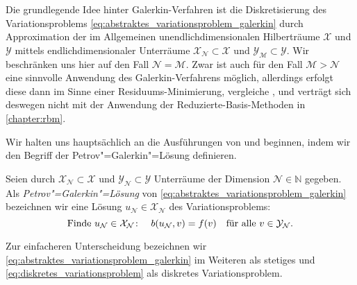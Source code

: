 \documentclass[../main.tex]{subfiles}
\begin{document}
Die grundlegende Idee hinter Galerkin-Verfahren ist die Diskretisierung des Variationsproblems \cref{eq:abstraktes_variationsproblem_galerkin} durch Approximation der im Allgemeinen unendlichdimensionalen Hilberträume $\mathcal X$ und $\mathcal Y$ mittels endlichdimensionaler Unterräume $\mathcal X_{\mathcal N} \subset \mathcal X$ und $\mathcal Y_{\mathcal M} \subset \mathcal Y$.
Wir beschränken uns hier auf den Fall $\mathcal N = \mathcal M$.
Zwar ist auch für den Fall $\mathcal M > \mathcal N$ eine sinnvolle Anwendung des Galerkin-Verfahrens möglich, allerdings erfolgt diese dann im Sinne einer Residuums-Minimierung, vergleiche \cite{Andreev:2012ep}, und verträgt sich deswegen nicht mit der Anwendung der Reduzierte-Basis-Methoden in \cref{chapter:rbm}.

Wir halten uns hauptsächlich an die Ausführungen von \textcite[Section 3.1]{Nochetto:2009il} und beginnen, indem wir den Begriff der Petrov"=Galerkin"=Lösung definieren.

\begin{Definition}
    \label{definition:disrekte_loesung}
    Seien durch $\mathcal X_{\mathcal N} \subset \mathcal X$ und $\mathcal Y_{\mathcal N} \subset \mathcal Y$ Unterräume der Dimension $\mathcal N \in \mathbb{N}$ gegeben.
    Als \emph{Petrov"=Galerkin"=Lösung} von \cref{eq:abstraktes_variationsproblem_galerkin} bezeichnen wir eine Lösung $u_{\mathcal N} \in \mathcal X_{\mathcal N}$ des Variationsproblems:
    \begin{equation}
        \label{eq:diskretes_variationsproblem}
        \text{Finde}~u_{\mathcal N} \in \mathcal X_{\mathcal N} \colon \quad  b(u_{\mathcal N}, v) = f(v) \quad \fa v \in \mathcal Y_{\mathcal N}.
    \end{equation}
\end{Definition}

Zur einfacheren Unterscheidung bezeichnen wir \cref{eq:abstraktes_variationsproblem_galerkin} im Weiteren als stetiges und \cref{eq:diskretes_variationsproblem} als diskretes Variationsproblem.
\end{document}
